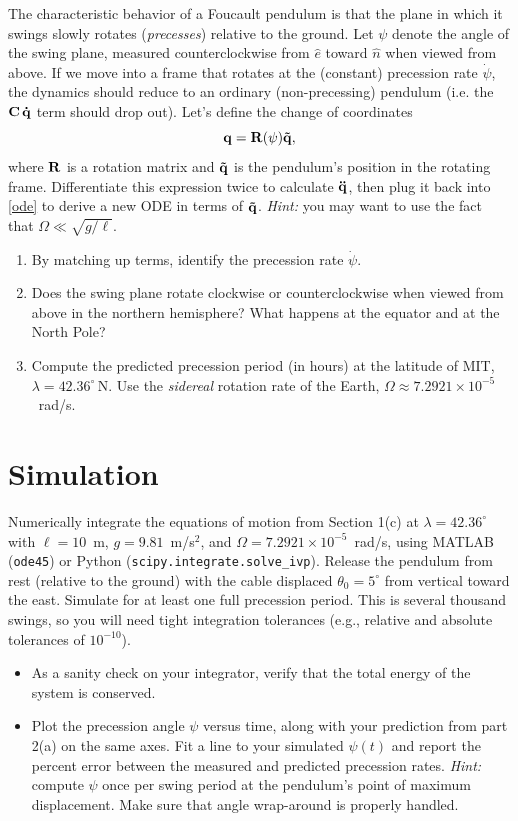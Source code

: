 \documentclass[11pt,letterpaper]{article}
\newcommand{\bq}{\mathbf{q}}
\newcommand{\ehat}{\hat{e}}
\newcommand{\nhat}{\hat{n}}
\begin{document}
The characteristic behavior of a Foucault pendulum is that the plane in which it swings slowly rotates (\emph{precesses}) relative to the ground. Let $\psi$ denote the angle of the swing plane, measured counterclockwise from $\ehat$ toward $\nhat$ when viewed from above.
 If we move into a frame that rotates at the (constant) precession rate $\dot{\psi}$, the dynamics should reduce to an ordinary (non-precessing) pendulum (i.e. the $\bf{C \, \dot{q}}$ term should drop out). Let's define the change of coordinates
	\begin{equation}
		\bq = \bf{R}(\psi) \tilde{q} ,
	\end{equation}
	where $\bf{R}$ is a rotation matrix and $\bf{\tilde{q}}$ is the pendulum's position in the rotating frame. Differentiate this expression twice to calculate $\bf{\ddot{q}}$, then plug it back into \eqref{ode} to derive a new ODE in terms of $\bf{\tilde{q}}$. \emph{Hint:} you may want to use the fact that $\Omega \ll \sqrt{g/\ell}$.
\begin{enumerate}[label=(\alph*)]
		\item By matching up terms, identify the precession rate $\dot{\psi}$.
        \item Does the swing plane rotate clockwise or counterclockwise when viewed from above in the northern hemisphere? What happens at the equator and at the North Pole?
        \item Compute the predicted precession period (in hours) at the latitude of MIT, $\lambda = 42.36^\circ$\,N. Use the \emph{sidereal} rotation rate of the Earth, $\Omega \approx 7.2921\times10^{-5}$~rad/s.
    \end{enumerate}
    

\section{Simulation}

Numerically integrate the equations of motion from Section 1(c) at $\lambda = 42.36^\circ$ with $\ell = 10$~m, $g = 9.81$~m/s$^2$, and $\Omega = 7.2921\times10^{-5}$~rad/s, using MATLAB (\texttt{ode45}) or Python (\texttt{scipy.integrate.\allowbreak solve\_ivp}). Release the pendulum from rest (relative to the ground) with the cable displaced $\theta_0 = 5^\circ$ from vertical toward the east. Simulate for at least one full precession period. This is several thousand swings, so you will need tight integration tolerances (e.g., relative and absolute tolerances of $10^{-10}$).
    \begin{itemize}
        \item  As a sanity check on your integrator, verify that the total energy of the system is conserved.
        \item Plot the precession angle $\psi$ versus time, along with your prediction from part 2(a) on the same axes. Fit a line to your simulated $\psi(t)$ and report the percent error between the measured and predicted precession rates. \emph{Hint:} compute $\psi$ once per swing period at the pendulum's point of maximum displacement. Make sure that angle wrap-around is properly handled.
\end{itemize}
\end{document}
